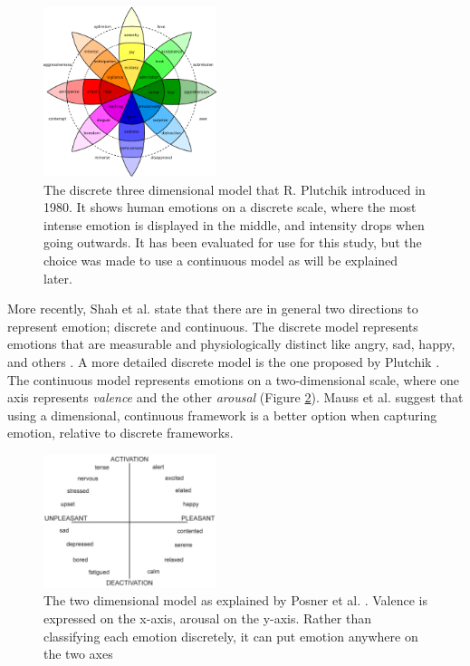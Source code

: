 \documentclass{sigchi}
\begin{document}
\begin{figure}[t]
    \centering
    \includegraphics[width=0.45\textwidth]{images/PlutchikWheelOfEmotions.eps}
    \caption{The discrete three dimensional model that R. Plutchik \protect\cite{Plutchik1980} introduced in 1980. It shows human emotions on a discrete scale, where the most intense emotion is displayed in the middle, and intensity drops when going outwards. It has been evaluated for use for this study, but the choice was made to use a continuous model as will be explained later.}
    \label{fig:wheel_of_emotions}
\end{figure}

More recently, Shah et al. \cite{Shah2015} state that there are in general two directions to represent emotion; discrete and continuous. The discrete model represents emotions that are measurable and physiologically distinct like angry, sad, happy, and others \cite{Ekman1992}. A more detailed discrete model is the one proposed by Plutchik \cite{Plutchik1980}. The continuous model represents emotions on a two-dimensional scale, where one axis represents \textit{valence} and the other \textit{arousal} \cite{Posner2005} (Figure \ref{fig:circumplex_model}). Mauss et al. \cite{Mauss2009} suggest that using a dimensional, continuous framework is a better option when capturing emotion, relative to discrete frameworks. 

\begin{figure}[t]
    \centering
    \includegraphics[width=0.45\textwidth]{images/CircumplexModel.jpg}
    \caption{The two dimensional model as explained by Posner et al. \protect\cite{Posner2005}. Valence is expressed on the x-axis, arousal on the y-axis. Rather than classifying each emotion discretely, it can put emotion anywhere on the two axes}
    \label{fig:circumplex_model}
\end{figure}
\end{document}
